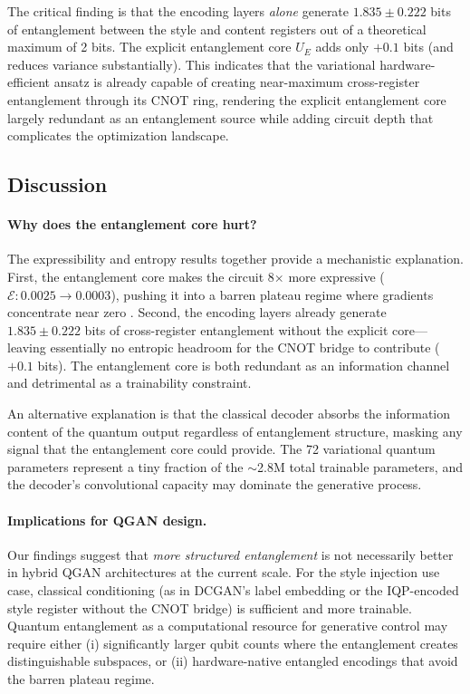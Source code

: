 \documentclass[twocolumn]{article}
\begin{document}
The critical finding is that the encoding layers \emph{alone} generate
$1.835 \pm 0.222$ bits of entanglement between the style and content registers
out of a theoretical maximum of 2 bits. The explicit entanglement core $U_E$
adds only $+0.1$ bits (and reduces variance substantially). This indicates that
the variational hardware-efficient ansatz is already capable of creating
near-maximum cross-register entanglement through its CNOT ring, rendering the
explicit entanglement core largely redundant as an entanglement source while
adding circuit depth that complicates the optimization landscape.

\subsection{Discussion}

\paragraph{Why does the entanglement core hurt?}
The expressibility and entropy results together provide a mechanistic explanation.
First, the entanglement core makes the circuit 8$\times$ more expressive
($\mathcal{E}: 0.0025 \to 0.0003$), pushing it into a barren plateau regime
where gradients concentrate near zero \cite{mcclean2018barren, cerezo2021cost}.
Second, the encoding layers already generate $1.835 \pm 0.222$ bits of
cross-register entanglement without the explicit core—leaving essentially no
entropic headroom for the CNOT bridge to contribute ($+0.1$ bits). The
entanglement core is both redundant as an information channel and
detrimental as a trainability constraint.

An alternative explanation is that the classical decoder absorbs the information
content of the quantum output regardless of entanglement structure, masking any
signal that the entanglement core could provide. The 72 variational quantum
parameters represent a tiny fraction of the $\sim$2.8M total trainable
parameters, and the decoder's convolutional capacity may dominate the
generative process.

\paragraph{Implications for QGAN design.}
Our findings suggest that \emph{more structured entanglement} is not
necessarily better in hybrid QGAN architectures at the current scale.
For the style injection use case, classical conditioning (as in DCGAN's label
embedding or the IQP-encoded style register without the CNOT bridge) is
sufficient and more trainable. Quantum entanglement as a computational
resource for generative control may require either (i) significantly larger
qubit counts where the entanglement creates distinguishable subspaces, or
(ii) hardware-native entangled encodings that avoid the barren plateau regime.
\end{document}

